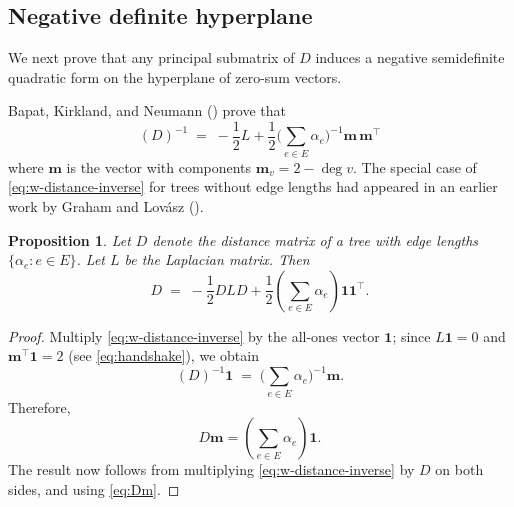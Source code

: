 \documentclass[12pt]{amsart}
\newtheorem{prop}[thm]{Proposition}
\theoremstyle{definition}
\newtheorem{rmk}[thm]{Remark}
\newcommand{\bone}{\mathbf{1}}
\newcommand{\boldm}{\mathbf{m}}
\newcommand{\Da}{{D}}
\newcommand{\La}{L}
\newcommand{\tr}{\intercal}
\newcommand\farbod[1]{\footnote{[\textcolor{orange}{(Farbod)} \textcolor{blue}{#1}]}}
\begin{document}
\subsection{Negative definite hyperplane}

We next prove that any principal submatrix of $D$ induces a negative semidefinite quadratic form on the hyperplane of zero-sum vectors.

Bapat, Kirkland, and Neumann (\cite[Theorem 2.1]{bapat-kirkland-neumann}) prove that
\begin{equation}
\label{eq:w-distance-inverse}
	(\Da)^{-1} \;=\; - \frac12 \La + \frac12 \Big( \sum_{e \in E} \alpha_e\Big)^{-1} \boldm\, \boldm^\tr
\end{equation}
where $\boldm$ is the vector with components $\boldm_v = 2 - \deg v$.
The special case of \eqref{eq:w-distance-inverse} for trees without edge lengths had appeared in an earlier work by Graham and Lov\'asz (\cite[Lemma 1]{graham-lovasz}).


\begin{prop}
\label{prop:dist-laplacian}
Let $D$ denote the distance matrix of a tree with edge lengths $\{\alpha_e \colon e \in E\}$. Let $\La$ be the Laplacian matrix. 
Then
\[
	\Da \;=\; - \frac{1}{2} \Da \La \Da + \frac{1}{2} \left( \sum_{e \in E} \alpha_e\right) \bone \bone^\tr .
\]
\end{prop}
\begin{proof}
Multiply \eqref{eq:w-distance-inverse} by the all-ones vector $\bone$; since $\La \bone = 0$ and $\boldm^\tr \bone = 2$ (see \eqref{eq:handshake}), we obtain 
\[
(\Da)^{-1} \bone \;=\; \Big( \sum_{e \in E} \alpha_e\Big)^{-1} \boldm .
\]
Therefore, 
\begin{equation}\label{eq:Dm}
\Da \boldm = \left( \sum_{e \in E} \alpha_e \right) \bone .
\end{equation}
The result now follows from multiplying \eqref{eq:w-distance-inverse} by $\Da$ on both sides, and using \eqref{eq:Dm}. 
\end{proof}
\end{document}
